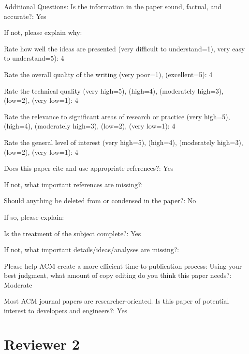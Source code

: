 \documentclass[10pt]{article}
\begin{document}
\begin{spverbatim}
Additional Questions:
Is the information in the paper sound, factual, and accurate?: Yes

If not, please explain why: 

Rate how well the ideas are presented (very difficult to understand=1), very easy to understand=5): 4

Rate the overall quality of the writing (very poor=1), (excellent=5): 4

Rate the technical quality (very high=5), (high=4), (moderately high=3), (low=2), (very low=1): 4

Rate the relevance to significant areas of research or practice (very high=5), (high=4), (moderately high=3), (low=2), (very low=1): 4

Rate the general level of interest (very high=5), (high=4), (moderately high=3), (low=2), (very low=1): 4

Does this paper cite and use appropriate references?: Yes

If not, what important references are missing?: 

Should anything be deleted from or condensed in the paper?: No

If so, please explain: 

Is the treatment of the subject complete?: Yes

If not, what important details/ideas/analyses are missing?: 

Please help ACM create a more efficient time-to-publication process: Using your best judgment, what amount of copy editing do you think this paper needs?: Moderate

Most ACM journal papers are researcher-oriented. Is this paper of potential interest to developers and engineers?: Yes
\end{spverbatim}


\section{Reviewer 2}
\end{document}
